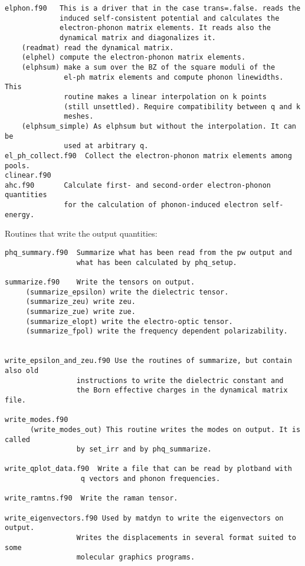 \documentclass[12pt,a4paper]{article}
\begin{document}
\begin{verbatim}
elphon.f90   This is a driver that in the case trans=.false. reads the
             induced self-consistent potential and calculates the
             electron-phonon matrix elements. It reads also the 
             dynamical matrix and diagonalizes it.
    (readmat) read the dynamical matrix.
    (elphel) compute the electron-phonon matrix elements.                 
    (elphsum) make a sum over the BZ of the square moduli of the 
              el-ph matrix elements and compute phonon linewidths. This
              routine makes a linear interpolation on k points 
              (still unsettled). Require compatibility between q and k 
              meshes.
    (elphsum_simple) As elphsum but without the interpolation. It can be
              used at arbitrary q.
el_ph_collect.f90  Collect the electron-phonon matrix elements among pools.
clinear.f90
ahc.f90       Calculate first- and second-order electron-phonon quantities
              for the calculation of phonon-induced electron self-energy.
\end{verbatim}

Routines that write the output quantities:

\begin{verbatim}
phq_summary.f90  Summarize what has been read from the pw output and
                 what has been calculated by phq_setup.

summarize.f90    Write the tensors on output. 
     (summarize_epsilon) write the dielectric tensor.
     (summarize_zeu) write zeu.
     (summarize_zue) write zue.
     (summarize_elopt) write the electro-optic tensor.
     (summarize_fpol) write the frequency dependent polarizability.


write_epsilon_and_zeu.f90 Use the routines of summarize, but contain also old 
                 instructions to write the dielectric constant and 
                 the Born effective charges in the dynamical matrix file.

write_modes.f90  
      (write_modes_out) This routine writes the modes on output. It is called
                 by set_irr and by phq_summarize.

write_qplot_data.f90  Write a file that can be read by plotband with
                  q vectors and phonon frequencies.

write_ramtns.f90  Write the raman tensor.

write_eigenvectors.f90 Used by matdyn to write the eigenvectors on output.
                 Writes the displacements in several format suited to some
                 molecular graphics programs.
\end{verbatim}
\end{document}
